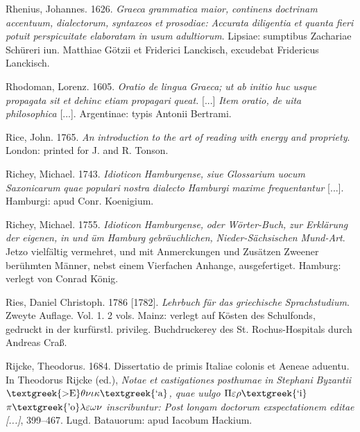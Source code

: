 \documentclass[output=paper]{langsci/langscibook}
\begin{document}
Rhenius, Johannes. 1626. \textit{Graeca} \textit{grammatica} \textit{maior,} \textit{continens} \textit{doctrinam} \textit{accentuum,} \textit{dialectorum,} \textit{syntaxeos} \textit{et} \textit{prosodiae:} \textit{Accurata} \textit{diligentia} \textit{et} \textit{quanta} \textit{fieri} \textit{potuit} \textit{perspicuitate} \textit{elaboratam} \textit{in} \textit{usum} \textit{adultiorum}. Lipsiae: sumptibus Zachariae Schüreri iun. Matthiae Götzii et Friderici Lanckisch, excudebat Fridericus Lanckisch.

Rhodoman, Lorenz. 1605. \textit{Oratio} \textit{de} \textit{lingua} \textit{Graeca;} \textit{ut} \textit{ab} \textit{initio} \textit{huc} \textit{usque} \textit{propagata} \textit{sit} \textit{et} \textit{dehinc} \textit{etiam} \textit{propagari} \textit{queat.} [...] \textit{Item} \textit{oratio,} \textit{de} \textit{uita} \textit{philosophica} [...]. Argentinae: typis Antonii Bertrami.

Rice, John. 1765. \textit{An} \textit{introduction} \textit{to} \textit{the} \textit{art} \textit{of} \textit{reading} \textit{with} \textit{energy} \textit{and} \textit{propriety}. London: printed for J. and R. Tonson.

Richey, Michael. 1743. \textit{Idioticon} \textit{Hamburgense,} \textit{siue} \textit{Glossarium} \textit{uocum} \textit{Saxonicarum} \textit{quae} \textit{populari} \textit{nostra} \textit{dialecto} \textit{Hamburgi} \textit{maxime} \textit{frequentantur} [...]. Hamburgi: apud Conr. Koenigium.

Richey, Michael. 1755. \textit{Idioticon} \textit{Hamburgense,} \textit{oder} \textit{Wörter-Buch,} \textit{zur} \textit{Erklärung} \textit{der} \textit{eigenen,} \textit{in} \textit{und} \textit{üm} \textit{Hamburg} \textit{gebräuchlichen,} \textit{Nieder-Sächsischen} \textit{Mund-Art}. Jetzo vielfältig vermehret, und mit Anmerckungen und Zusätzen Zweener berühmten Männer, nebst einem Vierfachen Anhange, ausgefertiget. Hamburg: verlegt von Conrad König.

Ries, Daniel Christoph. 1786 [1782]. \textit{Lehrbuch} \textit{für} \textit{das} \textit{griechische} \textit{Sprachstudium}. Zweyte Auflage. Vol. 1. 2 vols. Mainz: verlegt auf Kösten des Schulfonds, gedruckt in der kurfürstl. privileg. Buchdruckerey des St. Rochus-Hospitals durch Andreas Craß.

Rijcke, Theodorus. 1684. Dissertatio de primis Italiae colonis et Aeneae aduentu. In Theodorus Rijcke (ed.), \textit{Notae} \textit{et} \textit{castigationes} \textit{posthumae} \textit{in} \textit{Stephani} \textit{Byzantii} \textit{$\text{\textgreek{>E}}\theta \nu \iota \kappa \text{\textgreek{`a}}$, quae uulgo $\Pi \varepsilon \rho \text{\textgreek{`i}}$ $\pi \text{\textgreek{'o}}\lambda \varepsilon \omega \nu $ inscribuntur: Post longam doctorum exspectationem editae [...]}, 399–467. Lugd. Batauorum: apud Iacobum Hackium.
\end{document}
